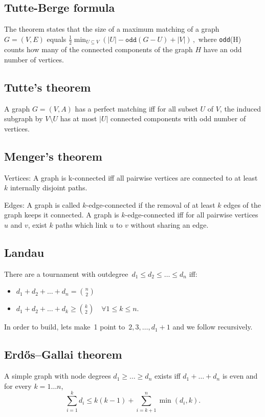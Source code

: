 \subsection{Tutte-Berge formula}
The theorem states that the size of a maximum matching of a graph $G=(V,E)$ equals ${\frac {1}{2}}\min _{U\subseteq V}\left(|U|- \texttt{odd}(G-U)+|V|\right)\,,$ where \texttt{odd}(H) counts how many of the connected components of the graph $H$ have an odd number of vertices.\\

\subsection{Tutte's theorem}
A graph $G = (V, A)$ has a perfect matching iff for all subset $U$ of $V$, the induced subgraph by $V \setminus U$ has at most $|U|$ connected components with odd number of vertices.\\

\subsection{Menger's theorem}
\item Vertices:
A graph is k-connected iff all pairwise vertices are connected to at least 
$k$ internally disjoint paths.
\item Edges:
A graph is called $k$-edge-connected if the removal of at least $k$ edges of the graph keeps it connected. A graph is $k$-edge-connected iff for all pairwise vertices $u$ and $v$, exist $k$ paths which link $u$ to $v$ without sharing an edge.\\

\subsection{Landau}
There are a tournament with outdegree~$d_1 \leq d_2 \leq \ldots \leq d_n$ iff:
\begin{itemize}
\item $d_1 + d_2 + \ldots + d_n = {n \choose 2}$\newline
\item $d_1 + d_2 + \ldots + d_k \geq {k \choose 2} \quad \forall 1 \leq k \leq n.$
\end{itemize}
In order to build, lets make~1 point to~$2, 3, \ldots, d_1 + 1$ and we follow recursively.\\

\subsection{Erdős–Gallai theorem}
A simple graph with node degrees $d_1 \ge \dots \ge d_n$ exists iff $d_1 + \dots + d_n$ is even and for every $k = 1\dots n$,
\[ \sum _{i=1}^{k}d_{i}\leq k(k-1)+\sum _{i=k+1}^{n}\min(d_{i},k). \]


